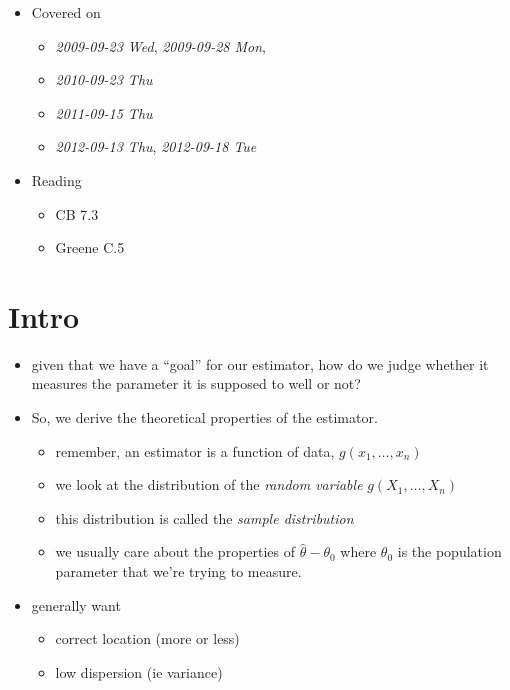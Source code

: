 
\begin{itemize}
\item Covered on
\begin{itemize}
\item \textit{2009-09-23 Wed}, \textit{2009-09-28 Mon},
\item \textit{2010-09-23 Thu}
\item \textit{2011-09-15 Thu}
\item \textit{2012-09-13 Thu}, \textit{2012-09-18 Tue}
\end{itemize}
\item Reading
\begin{itemize}
\item CB 7.3
\item Greene C.5
\end{itemize}
\end{itemize}
\section{Intro}
\label{sec-1}

\begin{itemize}
\item given that we have a ``goal'' for our estimator, how do we judge
     whether it measures the parameter it is supposed to well or not?
\item So, we derive the theoretical properties of the estimator.
\begin{itemize}
\item remember, an estimator is a function of data, $g(x_1,\dots,x_n)$
\item we look at the distribution of the \emph{random variable} $g(X_1,\dots,X_n)$
\item this distribution is called the \emph{sample distribution}
\item we usually care about the properties of $\hat \theta -
       \theta_0$ where $\theta_0$ is the population parameter that
       we're trying to measure.
\end{itemize}
\item generally want
\begin{itemize}
\item correct location (more or less)
\item low dispersion (ie variance)
\end{itemize}
\end{itemize}
